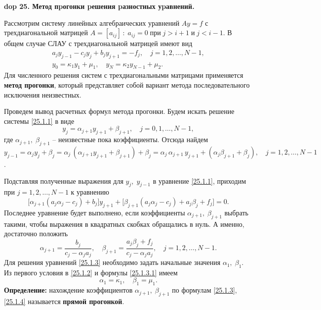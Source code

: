 \setcounter{section}{4}
\setcounter{subsection}{25}
\setcounter{equation}{0}
\textbf{\LARGE dop 25. Метод пpогонки pешения pазностных уpавнений.}

Рассмотрим систему линейных алгебраических уравнений $A y = f$ с трехдиагональной матрицей $A = [a_{ij}]\,:\; a_{ij} = 0 \;\textit{при}\; j > i+1\;\textit{и}\;j < i-1$. В общем случае СЛАУ с трехдиагональной матрицей имеют вид 
\begin{align}
\label{25.1.1}
    a_j y_{j-1} - c_j y_j + b_j y_{j+1} = -f_j, \quad j = 1, 2, \ldots, N - 1,\\
    \label{25.1.2}
    y_0 = \kappa_1 y_1 + \mu_1, \quad y_N = \kappa_2 y_{N-1} + \mu_2.
\end{align}
Для численного решения систем с трехдиагональными матрицами применяется \textbf{метод прогонки}, который представляет собой вариант метода последовательного исключения неизвестных. 

Проведем вывод расчетных формул метода прогонки. Будем искать решение системы \eqref{25.1.1} в виде 
\begin{equation}\label{25.1.3.1}
    y_j = \alpha_{j+1} y_{j+1} + \beta_{j+1}, \quad j = 0, 1, \ldots, N-1,
\end{equation}
где $\alpha_{j+1}, \; \beta_{j+1}$ -- неизвестные пока коэффициенты. Отсюда найдем $y_{j-1} = \alpha_{j} y_{j} + \beta_{j} = \alpha_j \,(\alpha_{j+1} y_{j+1} + \beta_{j+1}) + \beta_j = \alpha_j \,\alpha_{j+1}\,y_{j+1} + (\alpha_j \beta_{j+1} + \beta_j), \quad j = 1,2, \ldots, N-1$.

Подставляя полученные выражения для $y_j, \; y_{j-1}$ в уравнение \eqref{25.1.1}, приходим при $ j = 1,2, \ldots, N-1$ к уравнению
$$
\big[\alpha_{j+1}(a_j \alpha_j - c_j) + b_j \big] y_{j+1} + \big[\beta_{j+1}(a_j \alpha_j - c_j) + a_j \beta_j + f_j \big] = 0.
$$
Последнее уравнение будет выполнено, если коэффициенты $\alpha_{j+1}, \;\beta_{j+1}$ выбрать такими, чтобы выражения в квадратных скобках обращались в нуль. А именно, достаточно положить
\begin{equation}
    \label{25.1.3}
    \alpha_{j+1} = \frac{b_j}{c_j - \alpha_j a_j}, \quad 
    \beta_{j+1} = \frac{a_j \beta_j + f_j}{c_j - \alpha_j a_j}, \quad
    j = 1, 2, \ldots, N-1.
\end{equation}
Для решения уравнений \eqref{25.1.3} необходимо задать начальные значения $\alpha_1, \; \beta_1$. Из первого условия в \eqref{25.1.2} и формулы \eqref{25.1.3.1} имеем 
\begin{equation}
    \label{25.1.4}
    \alpha_1 = \kappa_1,\quad \beta_1 = \mu_1.
\end{equation}
\textbf{Определение:\;} нахождение коэффициентов $\alpha_{j+1}, \; \beta_{j+1}$ по формулам \eqref{25.1.3}, \eqref{25.1.4} называется \textbf{прямой прогонкой}.

